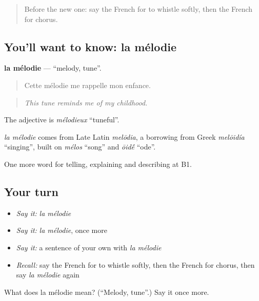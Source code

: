\label{lesson:FR-C512-melodie}



\begin{quote}
Before the new one: say the French for to whistle softly, then the French for chorus.
\end{quote}

\subsection*{You'll want to know: la mélodie}
\textbf{la mélodie} — \textquotedblleft{}melody, tune\textquotedblright{}.

\begin{quote}
Cette mélodie me rappelle mon enfance.
\end{quote}

\begin{quote}
\emph{This tune reminds me of my childhood.}
\end{quote}

The adjective is \emph{mélodieux} \textquotedblleft{}tuneful\textquotedblright{}.

\begin{cousinweb}
\emph{la mélodie} comes from Late Latin \emph{melōdia}, a borrowing from Greek \emph{melōidía} \textquotedblleft{}singing\textquotedblright{}, built on \emph{mélos} \textquotedblleft{}song\textquotedblright{} and \emph{ōid\'{\={e}}} \textquotedblleft{}ode\textquotedblright{}.
\end{cousinweb}

\begin{grammarlens}[title={What you've built}]
One more word for telling, explaining and describing at B1.
\end{grammarlens}

\subsection*{Your turn}
\begin{itemize}
\raggedright
  \item \emph{Say it:} \emph{la mélodie}
  \item \emph{Say it:} \emph{la mélodie}, once more
  \item \emph{Say it:} a sentence of your own with \emph{la mélodie}
  \item \emph{Recall:} say the French for to whistle softly, then the French for chorus, then say \emph{la mélodie} again
\end{itemize}

\begin{tcolorbox}[breakable,colback=teal!4,colframe=teal!35!black,title={Before you move on}]
What does la mélodie mean? (\textquotedblleft{}Melody, tune\textquotedblright{}.) Say it once more.
\end{tcolorbox}
